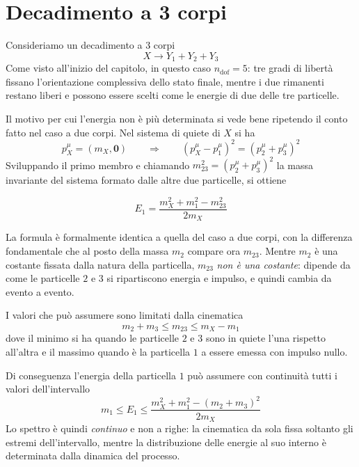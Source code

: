\section{Decadimento a 3 corpi}

Consideriamo un decadimento a $3$ corpi 
%
\begin{equation}
    X \to Y_1 + Y_2 + Y_3
\end{equation}
Come visto all'inizio del capitolo, in questo caso $n_{\text{dof}} = 5$: tre gradi di libertà fissano l'orientazione complessiva dello stato finale, mentre i due rimanenti restano liberi e possono essere scelti come le energie di due delle tre particelle. 

Il motivo per cui l'energia non è più determinata si vede bene ripetendo il conto fatto nel caso a due corpi. Nel sistema di quiete di $X$ si ha
%
\begin{equation*}
    p_X^{\mu} = (m_X, \mathbf{0}) \qquad \Longrightarrow \qquad (p_X^{\mu} - p_1^{\mu})^2 = (p_2^{\mu} + p_3^{\mu})^2
\end{equation*}
Sviluppando il primo membro e chiamando $m_{23}^2 = (p_2^{\mu} + p_3^{\mu})^2$ la massa invariante del sistema formato dalle altre due particelle, si ottiene
%
\begin{tcolorbox}[colback=black!5!white, colframe=black!45!white, boxrule=0.8pt]
\begin{equation}
    E_1 = \frac{m_X^2 + m_1^2 - m_{23}^2}{2 m_X}
\end{equation}
\end{tcolorbox}
La formula è formalmente identica a quella del caso a due corpi, con la differenza fondamentale che al posto della massa $m_2$ compare ora $m_{23}$. Mentre $m_2$ è una costante fissata dalla natura della particella, $m_{23}$ \emph{non è una costante}: dipende da come le particelle $2$ e $3$ si ripartiscono energia e impulso, e quindi cambia da evento a evento. 

I valori che può assumere sono limitati dalla cinematica
%
\begin{equation}
    m_2 + m_3 \leq m_{23} \leq m_X - m_1
\end{equation}
dove il minimo si ha quando le particelle $2$ e $3$ sono in quiete l'una rispetto all'altra e il massimo quando è la particella $1$ a essere emessa con impulso nullo. 

Di conseguenza l'energia della particella $1$ può assumere con continuità tutti i valori dell'intervallo
%
\begin{equation}
    m_1 \leq E_1 \leq \frac{m_X^2 + m_1^2 - (m_2+m_3)^2}{2 m_X}
\end{equation}
Lo spettro è quindi \emph{continuo} e non a righe: la cinematica da sola fissa soltanto gli estremi dell'intervallo, mentre la distribuzione delle energie al suo interno è determinata dalla dinamica del processo. \\

